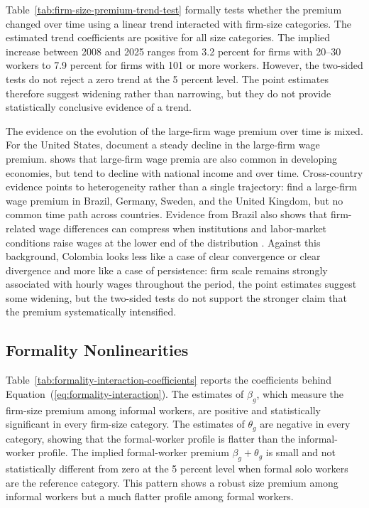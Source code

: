 Table~\ref{tab:firm-size-premium-trend-test} formally tests whether the premium changed over time using a linear trend interacted with firm-size categories. The estimated trend coefficients are positive for all size categories. The implied increase between 2008 and 2025 ranges from 3.2 percent for firms with 20--30 workers to 7.9 percent for firms with 101 or more workers. However, the two-sided tests do not reject a zero trend at the 5 percent level. The point estimates therefore suggest widening rather than narrowing, but they do not provide statistically conclusive evidence of a trend.

The evidence on the evolution of the large-firm wage premium over time is mixed. For the United States, \citet{BloomGuvenenSmithSongVonWachter2018} document a steady decline in the large-firm wage premium. \citet{reed2019large} shows that large-firm wage premia are also common in developing economies, but tend to decline with national income and over time. Cross-country evidence points to heterogeneity rather than a single trajectory: \citet{ColonnelliTagWebbWolter2018} find a large-firm wage premium in Brazil, Germany, Sweden, and the United Kingdom, but no common time path across countries. Evidence from Brazil also shows that firm-related wage differences can compress when institutions and labor-market conditions raise wages at the lower end of the distribution \citep{AlvarezBenguriaEngbomMoser2018,EngbomMoser2022}. Against this background, Colombia looks less like a case of clear convergence or clear divergence and more like a case of persistence: firm scale remains strongly associated with hourly wages throughout the period, the point estimates suggest some widening, but the two-sided tests do not support the stronger claim that the premium systematically intensified.



\subsection{Formality Nonlinearities}

Table~\ref{tab:formality-interaction-coefficients} reports the coefficients behind Equation~(\ref{eq:formality-interaction}). The estimates of \(\beta_g\), which measure the firm-size premium among informal workers, are positive and statistically significant in every firm-size category. The estimates of \(\theta_g\) are negative in every category, showing that the formal-worker profile is flatter than the informal-worker profile. The implied formal-worker premium \(\beta_g+\theta_g\) is small and not statistically different from zero at the 5 percent level when formal solo workers are the reference category. This pattern shows a robust size premium among informal workers but a much flatter profile among formal workers.

